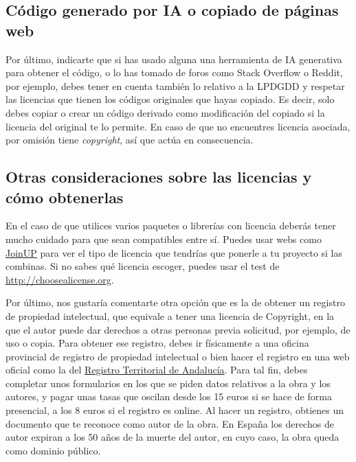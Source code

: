 \subsection{Código generado por IA o copiado de páginas web}

Por último, indicarte que si has usado alguna una herramienta de IA generativa para obtener el código, o lo has tomado de foros como Stack Overflow o Reddit, por ejemplo, debes tener en cuenta también lo relativo a la LPDGDD y respetar las licencias que tienen los códigos originales que hayas copiado. Es decir, solo debes copiar o crear un código derivado como modificación del copiado si la licencia del original te lo permite. En caso de que no encuentres licencia asociada, por omisión tiene \textit{copyright}, así que actúa en consecuencia.


\subsection{Otras consideraciones sobre las licencias y cómo obtenerlas}

En el caso de que utilices varios paquetes o librerías con licencia deberás tener mucho cuidado para que sean compatibles entre sí. Puedes usar webs como \href{https://joinup.ec.europa.eu/collection/eupl/soluti on/joinup-licensing-assistant/jla-compatibility-ch ecker}{JoinUP} para ver el tipo de licencia que tendrías que ponerle a tu proyecto si las combinas. Si no sabes qué licencia escoger, puedes usar el test de \url{http://choosealicense.org}.

Por último, nos gustaría comentarte otra opción que es la de obtener un registro de propiedad intelectual, que equivale a tener una licencia de Copyright, en la que el autor puede dar derechos a otras personas previa solicitud, por ejemplo, de uso o copia. Para obtener ese registro, debes ir físicamente a una oficina provincial de registro de propiedad intelectual o bien hacer el registro en una web oficial como la del \href{https://www.juntadeandalucia.es/organismos/turismoculturaydeporte/servicios/procedimientos/detalle/297.html}{Registro Territorial de Andalucía}. Para tal fin, debes completar unos formularios en los que se piden datos relativos a la obra y los autores, y pagar unas tasas que oscilan desde los 15 euros si se hace de forma presencial, a los 8 euros si el registro es online. Al hacer un registro, obtienes un documento que te reconoce como autor de la obra. En España los derechos de autor expiran a los 50 años de la muerte del autor, en cuyo caso, la obra queda como dominio público.

